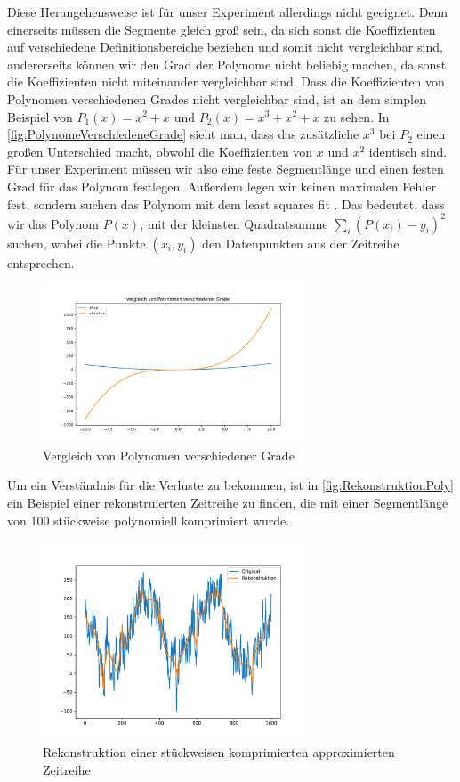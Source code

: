 Diese Herangehensweise ist für unser Experiment allerdings nicht geeignet. Denn einerseits müssen die Segmente gleich groß sein, da sich sonst die Koeffizienten auf verschiedene Definitionsbereiche beziehen und somit nicht vergleichbar sind, andererseits können wir den Grad der Polynome nicht beliebig machen, da sonst die Koeffizienten nicht miteinander vergleichbar sind. Dass die Koeffizienten von Polynomen verschiedenen Grades nicht vergleichbar sind, ist an dem simplen Beispiel von $P_1(x)=x^2+x$ und $P_2(x)=x^3+x^2+x$ zu sehen. In \autoref{fig:PolynomeVerschiedeneGrade} sieht man, dass das zusätzliche $x^3$ bei $P_2$ einen großen Unterschied macht, obwohl die Koeffizienten von $x$ und $x^2$ identisch sind. Für unser Experiment müssen wir also eine feste Segmentlänge und einen festen Grad für das Polynom festlegen. Außerdem legen wir keinen maximalen Fehler fest, sondern suchen das Polynom mit dem least squares fit \cite{leastSquares}. Das bedeutet, dass wir das Polynom $P(x)$, mit der kleinsten Quadratsumme $\sum_i (P(x_i)-y_i)^2$ suchen, wobei die Punkte $(x_i,y_i)$ den Datenpunkten aus der Zeitreihe entsprechen.
\begin{figure}[bth] 
  \centering
  \includegraphics[width=0.7\textwidth]{Graphics/ComparissonDifferentPolDegrees.pdf}
  \caption{Vergleich von Polynomen verschiedener Grade}
  \label{fig:PolynomeVerschiedeneGrade}
\end{figure}

Um ein Verständnis für die Verluste zu bekommen, ist in \autoref{fig:RekonstruktionPoly} ein Beispiel einer rekonstruierten Zeitreihe zu finden, die mit einer Segmentlänge von 100 stückweise polynomiell komprimiert wurde.
\begin{figure}[bth] 
  \centering
  \includegraphics[width=0.7\textwidth]{Graphics/RekonstruktionPoly.pdf}
  \caption{Rekonstruktion einer stückweisen komprimierten approximierten Zeitreihe}
  \label{fig:RekonstruktionPoly}
\end{figure}

